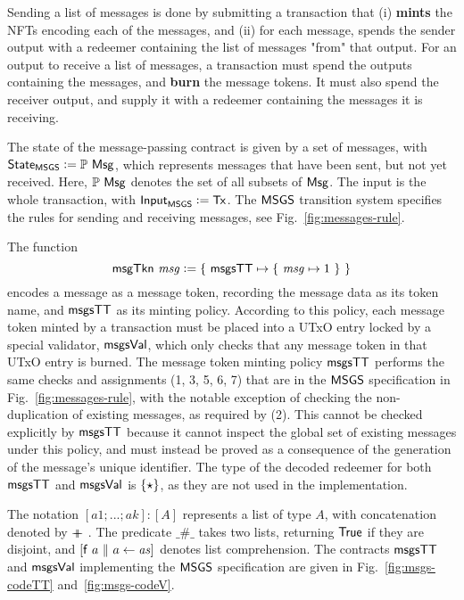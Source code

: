 Sending a list of messages is done by submitting a transaction that (i) \textbf{mints} the
NFTs encoding each of the messages, and (ii) for each message, spends the sender
output with a redeemer containing the list of messages "from" that output.
For an output to receive a list of messages, a transaction must spend the outputs containing the
messages, and \textbf{burn} the message tokens. It must also spend the receiver output,
and supply it with a redeemer containing the messages it is receiving.

The state of the message-passing contract is given by a set of messages, with
$\mathsf{State}_{\mathsf{MSGS}} \mathrel{\mathop:}= \mathbb{P}~\mathsf{Msg}$, which represents
messages that have been sent, but not yet received. Here, $\mathbb{P}~\mathsf{Msg}$
denotes the set of all subsets of $\mathsf{Msg}$.
The input is the whole transaction, with $\mathsf{Input}_{\mathsf{MSGS}} \mathrel{\mathop:}= \mathsf{Tx}$.
The $\mathsf{MSGS}$ transition system specifies the rules for sending and
receiving messages, see Fig.~\ref{fig:messages-rule}.

The function
\[\mathsf{msgTkn} ~\mathit{msg} \mathrel{\mathop:}= \{ ~\mathsf{msgsTT} \mapsto \{~\mathit{msg} \mapsto 1~\}~\}\]
encodes a message as a message token, recording the message data as its token name,
and $\mathsf{msgsTT}$ as its minting policy. According to this policy, each message token minted by
a transaction must be placed into a UTxO entry locked by a special validator, $\mathsf{msgsVal}$,
which only checks that any message token in that UTxO entry
is burned. The message token minting policy $\mathsf{msgsTT}$ performs the same
checks and assignments (1, 3, 5, 6, 7) that are in the $\mathsf{MSGS}$ specification in Fig.~\ref{fig:messages-rule},
with the notable exception of checking the non-duplication of existing messages,
as required by (2). This cannot be checked explicitly by $\mathsf{msgsTT}$ because
it cannot inspect the global set of existing messages under this policy, and
must instead be proved as a consequence of the generation of the message's unique
identifier. The type of the decoded redeemer for both $\mathsf{msgsTT}$ and
$\mathsf{msgsVal}$ is $\{\star\}$, as they are not used in the implementation.

The notation $[a1; ... ; ak] : [A]$ represents a list of type $A$, with concatenation
denoted by $+\!\!\!\!+\ $. The predicate $\_ \# \_$ takes two lists, returning $\mathsf{True}$ if
they are disjoint, and $[ \mathsf{f}~a~ \|~ a \leftarrow \mathit{as}]$ denotes list comprehension.
The contracts $\mathsf{msgsTT}$ and $\mathsf{msgsVal}$ implementing the $\mathsf{MSGS}$ specification
are given in Fig.~\ref{fig:msgs-codeTT} and~\ref{fig:msgs-codeV}.

